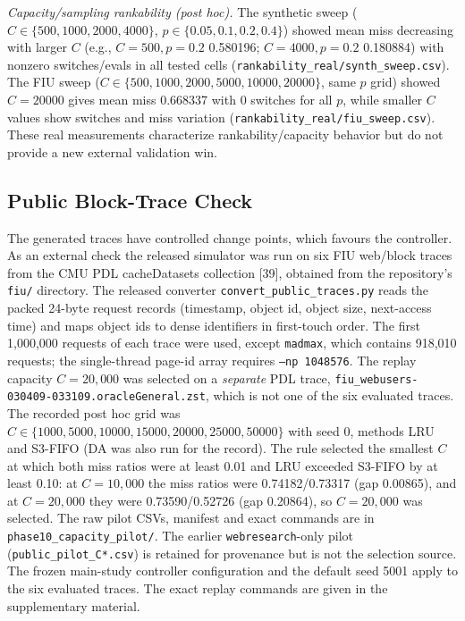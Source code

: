 \documentclass[10pt,twocolumn,a4paper]{IEEEtran}
\begin{document}
\emph{Capacity/sampling rankability (post hoc).} The synthetic sweep
($C\in\{500,1000,2000,4000\}$, $p\in\{0.05,0.1,0.2,0.4\}$) showed mean miss
decreasing with larger $C$ (e.g., $C=500,p=0.2$ 0.580196; $C=4000,p=0.2$
0.180884) with nonzero switches/evals in all tested cells
(\texttt{rankability\_real/synth\_sweep.csv}). The FIU sweep
($C\in\{500,1000,2000,5000,10000,20000\}$, same $p$ grid) showed
$C=20000$ gives mean miss 0.668337 with 0 switches for all $p$, while smaller
$C$ values show switches and miss variation
(\texttt{rankability\_real/fiu\_sweep.csv}). These real measurements
characterize rankability/capacity behavior but do not provide a new external
validation win.

\subsection{Public Block-Trace Check}
\label{sec:public}
The generated traces have controlled change points, which favours the
controller. As an external check the released simulator was run on six FIU
web/block traces from the CMU PDL cacheDatasets collection [39], obtained from
the repository's \texttt{fiu/} directory. The released converter
\texttt{convert\_public\_traces.py} reads the packed 24-byte request records
(timestamp, object id, object size, next-access time) and maps object ids to
dense identifiers in first-touch order. The first 1,000,000 requests of each
trace were used, except \texttt{madmax}, which contains 918,010 requests; the
single-thread page-id array requires \texttt{--np 1048576}. The replay
capacity $C = 20{,}000$ was selected on a \emph{separate} PDL trace,
\texttt{fiu\_webusers-030409-033109.oracleGeneral.zst}, which is not one of the
six evaluated traces. The recorded post hoc grid was $C \in \{1000, 5000, 10000,
15000, 20000, 25000, 50000\}$ with seed 0, methods LRU and S3-FIFO (DA was also
run for the record). The rule selected the smallest $C$ at which both miss
ratios were at least 0.01 and LRU exceeded S3-FIFO by at least 0.10: at
$C = 10{,}000$ the miss ratios were 0.74182/0.73317 (gap 0.00865), and at
$C = 20{,}000$ they were 0.73590/0.52726 (gap 0.20864), so $C = 20{,}000$ was
selected. The raw pilot CSVs, manifest and exact commands are in
\texttt{phase10\_capacity\_pilot/}. The earlier \texttt{webresearch}-only pilot
(\texttt{public\_pilot\_C*.csv}) is retained for provenance but is not the
selection source. The frozen main-study controller configuration and the
default seed 5001 apply to the six evaluated traces. The exact replay commands
are given in the supplementary material.
\end{document}
